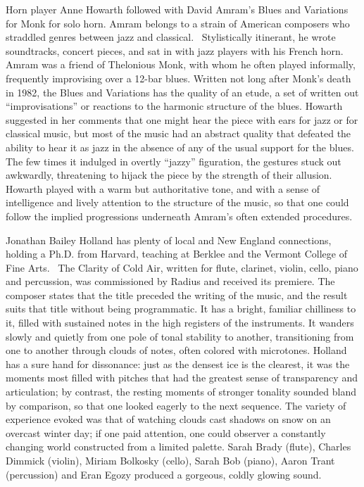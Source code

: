 Horn player Anne Howarth followed with David Amram’s Blues and Variations for Monk for solo horn. Amram belongs to a strain of American composers who straddled genres between jazz and classical.  Stylistically itinerant, he wrote soundtracks, concert pieces, and sat in with jazz players with his French horn. Amram was a friend of Thelonious Monk, with whom he often played informally, frequently improvising over a 12-bar blues. Written not long after Monk’s death in 1982, the Blues and Variations has the quality of an etude, a set of written out “improvisations” or reactions to the harmonic structure of the blues. Howarth suggested in her comments that one might hear the piece with ears for jazz or for classical music, but most of the music had an abstract quality that defeated the ability to hear it as jazz in the absence of any of the usual support for the blues. The few times it indulged in overtly “jazzy” figuration, the gestures stuck out awkwardly, threatening to hijack the piece by the strength of their allusion. Howarth played with a warm but authoritative tone, and with a sense of intelligence and lively attention to the structure of the music, so that one could follow the implied progressions underneath Amram’s often extended procedures.

Jonathan Bailey Holland has plenty of local and New England connections, holding a Ph.D. from Harvard, teaching at Berklee and the Vermont College of Fine Arts.  The Clarity of Cold Air, written for flute, clarinet, violin, cello, piano and percussion, was commissioned by Radius and received its premiere. The composer states that the title preceded the writing of the music, and the result suits that title without being programmatic. It has a bright, familiar chilliness to it, filled with sustained notes in the high registers of the instruments. It wanders slowly and quietly from one pole of tonal stability to another, transitioning from one to another through clouds of notes, often colored with microtones. Holland has a sure hand for dissonance: just as the densest ice is the clearest, it was the moments most filled with pitches that had the greatest sense of transparency and articulation; by contrast, the resting moments of stronger tonality sounded bland by comparison, so that one looked eagerly to the next sequence. The variety of experience evoked was that of watching clouds cast shadows on snow on an overcast winter day; if one paid attention, one could observer a constantly changing world constructed from a limited palette. Sarah Brady (flute), Charles Dimmick (violin), Miriam Bolkosky (cello), Sarah Bob (piano), Aaron Trant (percussion) and Eran Egozy produced a gorgeous, coldly glowing sound.

